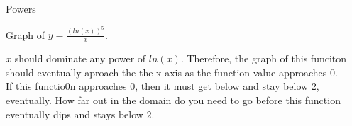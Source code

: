 \documentclass{ximera}
\begin{document}
\begin{example} Powers


Graph of $y = \frac{(ln(x))^5}{x}$.

$x$ should dominate any power of $ln(x)$.  Therefore, the graph of this funciton should eventually aproach the the x-axis as the function value approaches $0$. \\


If this functio0n approaches $0$, then it must get below and stay below $2$, eventually. How far out in the domain do you need to go before this function eventually dips and stays below $2$.


\begin{center}
\end{center}


\end{example}
\end{document}
